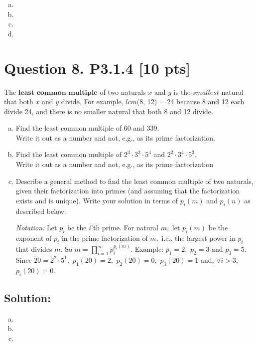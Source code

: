 \documentclass[12pt]{article}
\begin{document}
\begin{enumerate}[(a)]
    \item
    \item
    \item
    \item
\end{enumerate}
    


\newpage

\section*{\textbf{Question 8. P3.1.4} [10 pts]}
 The $\textbf{least common multiple}$ of two naturals $x$ and $y$ is the $smallest$ natural that both $x$ and $y$ divide. For example, $lcm$(8, 12) = 24 because 8 and 12 each divide 24, and there is no smaller natural that both 8 and 12 divide.
\begin{enumerate}[(a)]

    \item  Find the least common multiple of 60 and 339. \\
    Write it out as a number and not, e.g., as its prime factorization.

    \item  Find the least common multiple of $2^3 \cdot 3^2 \cdot 5^4$ and $2^2 \cdot 3^4 \cdot 5^3$. \\
     Write it out as a number and not, e.g., as its prime factorization

    \item  Describe a general method to find the least common multiple of two naturals, given their factorization into primes (and assuming that the factorization exists and is unique).
    Write your solution in terms of $p_i(m)$ and $p_i(n)$ as described below.
    
    {\em Notation:}  Let $p_i$ be the $i$'th prime.  For  natural $m,$  let $p_i(m)$ be the exponent of $p_i$ in the prime factorization of $m,$ i.e., the largest power in $p_i$ that divides $m.$  So $m= \prod_{i=1}^\infty p_i^{p_i(m)}.$ Example: 
    $p_1=2,$ $p_2=3$ and $p_3=5.$  Since $20= 2^2 \cdot 5^1,$  $p_1(20)=2,$     $p_2(20)=0,$  $p_3(20)=1$ and, $\forall i > 3,$ $p_i(20)=0.$
\end{enumerate}


\subsection*{\textbf{Solution:}} 
\begin{enumerate}[(a)]
 \item  
 \item  
 \item  
\end{enumerate}
\end{document}
